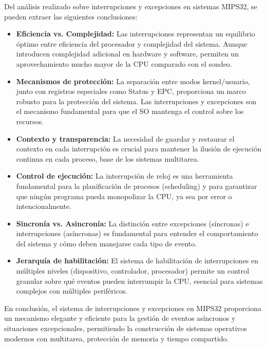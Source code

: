 \documentclass[12pt]{article}
\begin{document}
	Del análisis realizado sobre interrupciones y excepciones en sistemas MIPS32, se pueden extraer las siguientes conclusiones:
	
	\begin{itemize}
		\item \textbf{Eficiencia vs. Complejidad:} Las interrupciones representan un equilibrio óptimo entre eficiencia del procesador y complejidad del sistema. Aunque introducen complejidad adicional en hardware y software, permiten un aprovechamiento mucho mayor de la CPU comparado con el sondeo.
		
		\item \textbf{Mecanismos de protección:} La separación entre modos kernel/usuario, junto con registros especiales como Status y EPC, proporciona un marco robusto para la protección del sistema. Las interrupciones y excepciones son el mecanismo fundamental para que el SO mantenga el control sobre los recursos.
		
		\item \textbf{Contexto y transparencia:} La necesidad de guardar y restaurar el contexto en cada interrupción es crucial para mantener la ilusión de ejecución continua en cada proceso, base de los sistemas multitarea.
		
		\item \textbf{Control de ejecución:} La interrupción de reloj es una herramienta fundamental para la planificación de procesos (scheduling) y para garantizar que ningún programa pueda monopolizar la CPU, ya sea por error o intencionalmente.
		
		\item \textbf{Sincronía vs. Asincronía:} La distinción entre excepciones (síncronas) e interrupciones (asíncronas) es fundamental para entender el comportamiento del sistema y cómo deben manejarse cada tipo de evento.
		
		\item \textbf{Jerarquía de habilitación:} El sistema de habilitación de interrupciones en múltiples niveles (dispositivo, controlador, procesador) permite un control granular sobre qué eventos pueden interrumpir la CPU, esencial para sistemas complejos con múltiples periféricos.
	\end{itemize}
	
	En conclusión, el sistema de interrupciones y excepciones en MIPS32 proporciona un mecanismo elegante y eficiente para la gestión de eventos asíncronos y situaciones excepcionales, permitiendo la construcción de sistemas operativos modernos con multitarea, protección de memoria y tiempo compartido.
	
\end{document}
